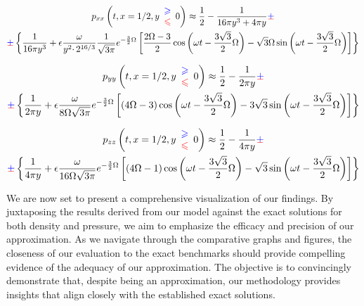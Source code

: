 \begin{multline}
p_{xx}\left( t,x=1/2,y\begin{array}{ c }
\textcolor[rgb]{0,0,1}{\geqslant }\\
\textcolor[rgb]{1,0,0}{\leqslant }
\end{array} 0\right)
\approx
\frac{1}{2} -\frac{1}{16\pi y^{3} +4\pi y} \cpm \\
\cpm \left\{\frac{1}{16\pi y^{3}} +\epsilon \frac{\omega }{y^{2} \cdotp 2^{16/3}}\frac{1}{\sqrt{3\pi }} e^{-\frac{3}{2} \Omega }\left[\frac{2\Omega -3}{2}\cos\left( \omega t-\frac{3\sqrt{3}}{2} \Omega \right) -\sqrt{3} \Omega \sin\left( \omega t-\frac{3\sqrt{3}}{2} \Omega \right)\right]\right\}
\end{multline}

\begin{multline}
p_{yy}\left( t,x=1/2,y\begin{array}{ c }
\textcolor[rgb]{0,0,1}{\geqslant }\\
\textcolor[rgb]{1,0,0}{\leqslant }
\end{array} 0\right)
\approx
\frac{1}{2} -\frac{1}{2\pi y} \cpm \\
\cpm \left\{\frac{1}{2\pi y} +\epsilon \frac{\omega }{8\Omega \sqrt{3\pi }} e^{-\frac{3}{2} \Omega }\left[( 4\Omega -3)\cos\left( \omega t-\frac{3\sqrt{3}}{2} \Omega \right) -3\sqrt{3}\sin\left( \omega t-\frac{3\sqrt{3}}{2} \Omega \right)\right]\right\}
\end{multline}

\begin{multline}
p_{zz}\left( t,x=1/2,y\begin{array}{ c }
\textcolor[rgb]{0,0,1}{\geqslant }\\
\textcolor[rgb]{1,0,0}{\leqslant }
\end{array} 0\right)
\approx
\frac{1}{2} -\frac{1}{4\pi y} \cpm \\
\cpm \left\{\frac{1}{4\pi y} +\epsilon \frac{\omega }{16\Omega \sqrt{3\pi }} e^{-\frac{3}{2} \Omega }\left[( 4\Omega -1)\cos\left( \omega t-\frac{3\sqrt{3}}{2} \Omega \right) -\sqrt{3}\sin\left( \omega t-\frac{3\sqrt{3}}{2} \Omega \right)\right]\right\}
\end{multline}

We are now set to present a comprehensive visualization of our findings. By juxtaposing the results derived from our model against the exact solutions for both density and pressure, we aim to emphasize the efficacy and precision of our approximation. As we navigate through the comparative graphs and figures, the closeness of our evaluation to the exact benchmarks should provide compelling evidence of the adequacy of our approximation. The objective is to convincingly demonstrate that, despite being an approximation, our methodology provides insights that align closely with the established exact solutions.

